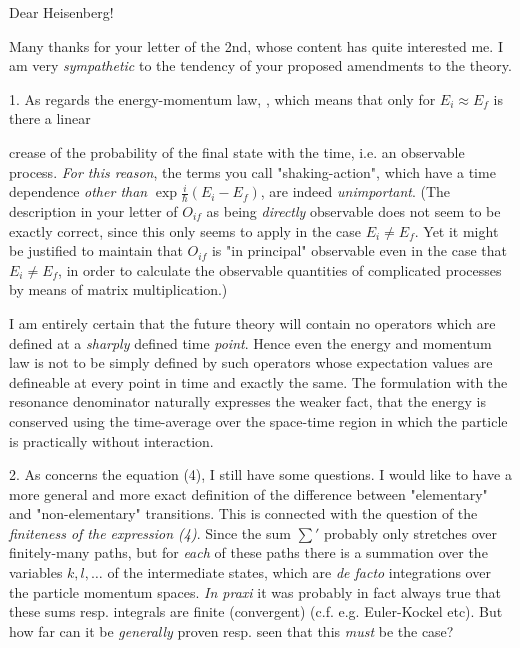 \date{February 5, 1937}

Dear Heisenberg!

Many thanks for your letter of the 2nd, whose content has quite interested me. I am very \textit{sympathetic} to the tendency of your proposed amendments to the theory. 

1. As regards the energy-momentum law, , which means that only for $E_i \approx E_f$ is there a linear 

crease of the probability of the final state with the time, i.e. an observable process. \textit{For this reason}, the terms you call "shaking-action", which have a time dependence \textit{other than} $\exp{\frac{i}{\hbar}(E_i-E_f)}$, are indeed \textit{unimportant}. (The description in your letter of $O_{if}$ as being \textit{directly} observable does not seem to be exactly correct, since this only seems to apply in the case $E_i \neq E_f$. Yet it might be justified to maintain that $O_{if}$ is "in principal" observable even in the case that $E_i \neq E_f$,  in order to calculate the observable quantities of complicated processes by means of matrix multiplication.)

I am entirely certain that the future theory will contain no operators which are defined at a \textit{sharply} defined time \textit{point}. Hence even the energy and momentum law is not to be simply defined by such operators whose expectation values are defineable at every point in time and exactly the same. The formulation with the resonance denominator naturally expresses the weaker fact, that the energy is conserved using the time-average over the space-time region in which the particle is practically without interaction.

2. As concerns the  equation (4), I still have some questions. I would like to have a more general and more exact definition of the difference between "elementary" and "non-elementary" transitions. This is connected with the question of the \textit{finiteness of the expression (4)}. Since the sum $\sum'$ probably only stretches over finitely-many paths, but for \textit{each} of these paths there is a summation over the variables $k,l,\dots$ of the intermediate states, which are \textit{de facto} integrations over the particle momentum spaces. \textit{In praxi} it was probably in fact always true that these sums resp. integrals are finite (convergent) (c.f. e.g. Euler-Kockel etc). But how far can it be \textit{generally} proven resp. seen that this \textit{must} be the case?

